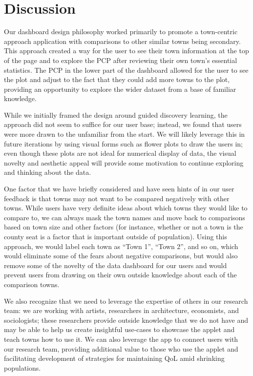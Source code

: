 \documentclass[print]{nuthesis}
\begin{document}
\section{ Discussion}

Our dashboard design philosophy worked primarily to promote a town-centric approach application with comparisons to other similar towns being secondary. This approach created a way for the user to see their town information at the top of the page and to explore the PCP after reviewing their own town's essential statistics. The PCP in the lower part of the dashboard allowed for the user to see the plot and adjust to the fact that they could add more towns to the plot, providing an opportunity to explore the wider dataset from a base of familiar knowledge.

While we initially framed the design around guided discovery learning, the approach did not seem to suffice for our user base; instead, we found that users were more drawn to the unfamiliar from the start. We will likely leverage this in future iterations by using visual forms such as flower plots to draw the users in; even though these plots are not ideal for numerical display of data, the visual novelty and aesthetic appeal will provide some motivation to continue exploring and thinking about the data.

One factor that we have briefly considered and have seen hints of in our user feedback is that towns may not want to be compared negatively with other towns. While users have very definite ideas about which towns they would like to compare to, we can always mask the town names and move back to comparisons based on town size and other factors (for instance, whether or not a town is the county seat is a factor that is important outside of population). Using this approach, we would label each town as ``Town 1'', ``Town 2'', and so on, which would eliminate some of the fears about negative comparisons, but would also remove some of the novelty of the data dashboard for our users and would prevent users from drawing on their own outside knowledge about each of the comparison towns.

We also recognize that we need to leverage the expertise of others in our research team: we are working with artists, researchers in architecture, economists, and sociologists; these researchers provide outside knowledge that we do not have and may be able to help us create insightful use-cases to showcase the applet and teach towns how to use it. We can also leverage the app to connect users with our research team, providing additional value to those who use the applet and facilitating development of strategies for maintaining QoL amid shrinking populations.
\end{document}
